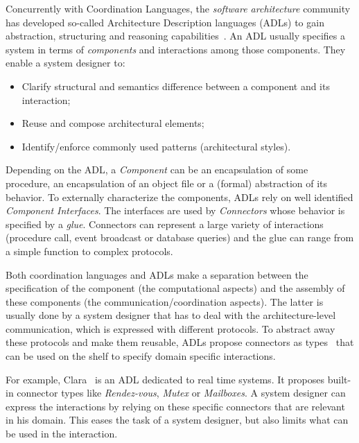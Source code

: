 Concurrently with Coordination Languages, the \emph{software architecture} community has developed so-called Architecture Description languages (ADLs) to gain abstraction, structuring and reasoning capabilities~\cite{rapidebib,wrightbib,uniconbib,frameadlsbib,garlansoftarchbib}. An ADL usually specifies a system in terms of \emph{components} and interactions among those components. They enable a system designer to:
\begin{itemize}
	\item Clarify structural and semantics difference between a component and its interaction;
	\item Reuse and compose architectural elements;
	\item Identify/enforce commonly used patterns (\eg architectural styles).
\end{itemize}

Depending on the ADL, a \emph{Component} can be an encapsulation of some procedure, an encapsulation of an object file or a (formal) abstraction of its behavior. To externally characterize the components, ADLs rely on well identified \emph{Component Interfaces}. The interfaces are used by \emph{Connectors} whose behavior is specified by a \emph{glue}. Connectors can represent a large variety of interactions (\eg procedure call, event broadcast or database queries) and the glue can range from a simple function to complex protocols. 

Both coordination languages and ADLs make a separation between the specification of the component (\ie the computational aspects) and the assembly of these components (\ie the communication/coordination aspects). The latter is usually done by a system designer that has to deal with the architecture-level communication, which is expressed with different protocols. To abstract away these protocols and make them reusable, ADLs propose connectors as types~\cite{frameadlsbib} that can be used on the shelf to specify domain specific interactions.

For example, Clara~\cite{clarabib} is an ADL dedicated to real time systems. It proposes built-in connector types like \emph{Rendez-vous}, \emph{Mutex} or \emph{Mailboxes}. A system designer can express the interactions by relying on these specific connectors that are relevant in his domain. This eases the task of a system designer, but also limits what can be used in the interaction. 

